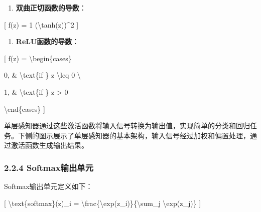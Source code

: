 
\begin{enumerate}
\def\labelenumi{\arabic{enumi}.}
\item
  \textbf{双曲正切函数的导数}：
\end{enumerate}

{[} f\textquotesingle(z) = 1 (\textbackslash tanh(z))\^{}2 {]}


\begin{enumerate}
\def\labelenumi{\arabic{enumi}.}
\item
  \textbf{ReLU函数的导数}：
\end{enumerate}

{[} f\textquotesingle(z) = \textbackslash begin\{cases\}

0, \& \textbackslash text\{if \} z \textbackslash leq 0 \textbackslash{}

1, \& \textbackslash text\{if \} z \textgreater{} 0

\textbackslash end\{cases\} {]}


单层感知器通过这些激活函数将输入信号转换为输出值，实现简单的分类和回归任务。下侧的图示展示了单层感知器的基本架构，输入信号经过加权和偏置处理，通过激活函数生成输出结果。


\subsubsection{\texorpdfstring{\textbf{2.2.4
Softmax输出单元}}{2.2.4 Softmax输出单元}}\label{224-softmaxux8f93ux51faux5355ux5143}

Softmax输出单元定义如下：

{[} \textbackslash text\{softmax\}(z)\_i =
\textbackslash frac\{\textbackslash exp(z\_i)\}\{\textbackslash sum\_j
\textbackslash exp(z\_j)\} {]}


